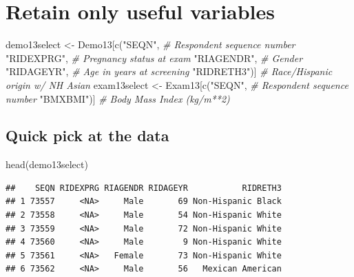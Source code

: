 \documentclass[
]{book}
\newenvironment{Shaded}{\begin{snugshade}}{\end{snugshade}}
\newcommand{\CommentTok}[1]{\textcolor[rgb]{0.56,0.35,0.01}{\textit{#1}}}
\newcommand{\FunctionTok}[1]{\textcolor[rgb]{0.00,0.00,0.00}{#1}}
\newcommand{\NormalTok}[1]{#1}
\newcommand{\OtherTok}[1]{\textcolor[rgb]{0.56,0.35,0.01}{#1}}
\newcommand{\StringTok}[1]{\textcolor[rgb]{0.31,0.60,0.02}{#1}}
\begin{document}
\hypertarget{retain-only-useful-variables}{%
\section{Retain only useful variables}\label{retain-only-useful-variables}}

\begin{Shaded}
\begin{Highlighting}[]
\NormalTok{demo13select }\OtherTok{\textless{}{-}}\NormalTok{ Demo13[}\FunctionTok{c}\NormalTok{(}\StringTok{"SEQN"}\NormalTok{, }\CommentTok{\# Respondent sequence number}
                         \StringTok{"RIDEXPRG"}\NormalTok{, }\CommentTok{\# Pregnancy status at exam}
                         \StringTok{"RIAGENDR"}\NormalTok{, }\CommentTok{\# Gender}
                         \StringTok{"RIDAGEYR"}\NormalTok{, }\CommentTok{\# Age in years at screening}
                         \StringTok{"RIDRETH3"}\NormalTok{)]  }\CommentTok{\# Race/Hispanic origin w/ NH Asian}
\NormalTok{exam13select }\OtherTok{\textless{}{-}}\NormalTok{ Exam13[}\FunctionTok{c}\NormalTok{(}\StringTok{"SEQN"}\NormalTok{, }\CommentTok{\# Respondent sequence number}
                         \StringTok{"BMXBMI"}\NormalTok{)] }\CommentTok{\# Body Mass Index (kg/m**2)}
\end{Highlighting}
\end{Shaded}

\hypertarget{quick-pick-at-the-data}{%
\subsection{Quick pick at the data}\label{quick-pick-at-the-data}}

\begin{Shaded}
\begin{Highlighting}[]
\FunctionTok{head}\NormalTok{(demo13select)}
\end{Highlighting}
\end{Shaded}

\begin{verbatim}
##    SEQN RIDEXPRG RIAGENDR RIDAGEYR           RIDRETH3
## 1 73557     <NA>     Male       69 Non-Hispanic Black
## 2 73558     <NA>     Male       54 Non-Hispanic White
## 3 73559     <NA>     Male       72 Non-Hispanic White
## 4 73560     <NA>     Male        9 Non-Hispanic White
## 5 73561     <NA>   Female       73 Non-Hispanic White
## 6 73562     <NA>     Male       56   Mexican American
\end{verbatim}
\end{document}

